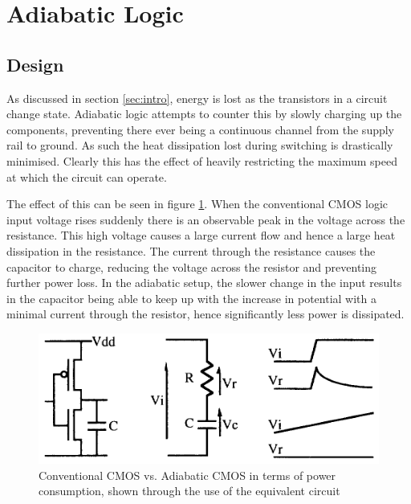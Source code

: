 \section{Adiabatic Logic}
\label{sec:adiabatic}

\subsection{Design}
As discussed in section \ref{sec:intro}, energy is lost as the transistors in a circuit change state.
Adiabatic logic attempts to counter this by slowly charging up the components, preventing there ever being a continuous channel from the supply rail to ground.
As such the heat dissipation lost during switching is drastically minimised.
Clearly this has the effect of heavily restricting the maximum speed at which the circuit can operate.

The effect of this can be seen in figure \ref{fig:convvsadia}.
When the conventional CMOS logic input voltage rises suddenly there is an observable peak in the voltage across the resistance.
This high voltage causes a large current flow and hence a large heat dissipation in the resistance.
The current through the resistance causes the capacitor to charge, reducing the voltage across the resistor and preventing further power loss.
In the adiabatic setup, the slower change in the input results in the capacitor being able to keep up with the increase in potential with a minimal current through the resistor, hence significantly less power is dissipated.

\begin{figure}
	\centering
	\includegraphics[width=\columnwidth]{../../images/conv_vs_adiabatic.png}
	\caption{Conventional CMOS vs. Adiabatic CMOS in terms of power consumption, shown through the use of the equivalent circuit \cite{DynAdiabatic}}
	\label{fig:convvsadia}
\end{figure}


